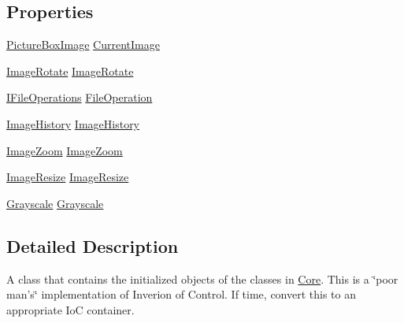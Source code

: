 \subsection*{Properties}
\begin{DoxyCompactItemize}
\item 
\hyperlink{class_core_1_1_images_1_1_picture_box_image}{PictureBoxImage} \hyperlink{class_core_1_1_shopped_gui_helper_a24c63c42ff514b7e04d7dbcc0276b0f6}{CurrentImage}
\item 
\hyperlink{class_core_1_1_image_rotate}{ImageRotate} \hyperlink{class_core_1_1_shopped_gui_helper_a5b4630078731e76cebeb2e0a6f613d33}{ImageRotate}
\item 
\hyperlink{interface_core_1_1_interfaces_1_1_i_file_operations}{IFileOperations} \hyperlink{class_core_1_1_shopped_gui_helper_a32813f467839c567ef0a972d8b7de1a2}{FileOperation}
\item 
\hyperlink{class_core_1_1_image_history}{ImageHistory} \hyperlink{class_core_1_1_shopped_gui_helper_a0660a7dfee17722d87d891e667cc6bf6}{ImageHistory}
\item 
\hyperlink{class_core_1_1_image_zoom}{ImageZoom} \hyperlink{class_core_1_1_shopped_gui_helper_a7353ed0ce33ce2af20c1c4f2b37bae0f}{ImageZoom}
\item 
\hyperlink{class_core_1_1_image_resize}{ImageResize} \hyperlink{class_core_1_1_shopped_gui_helper_acb483764bf793d2d52cc44e3c77cce4c}{ImageResize}
\item 
\hyperlink{class_core_1_1_grayscale}{Grayscale} \hyperlink{class_core_1_1_shopped_gui_helper_ad25ae5901349fc39148afb885c811da5}{Grayscale}
\end{DoxyCompactItemize}


\subsection{Detailed Description}
A class that contains the initialized objects of the classes in \hyperlink{namespace_core}{Core}. This is a \char`\"{}poor man's\char`\"{} implementation of Inverion of Control. If time, convert this to an appropriate IoC container. 

